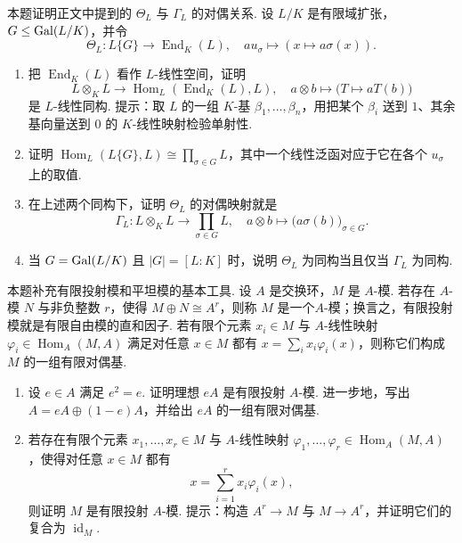 \begin{exercise}
    \begin{exgroup}
        \item 本题证明正文中提到的 $\Theta_L$ 与 $\Gamma_L$ 的对偶关系. 设 $L/K$ 是有限域扩张，$G\leq \operatorname{Gal}(L/K)$，并令
        \[
            \Theta_L\colon L\{G\}\to\operatorname{End}_K(L),\quad
            a u_\sigma\mapsto (x\mapsto a\sigma(x)).
        \]
        \begin{enumerate}
            \item 把 $\operatorname{End}_K(L)$ 看作 $L$-线性空间，证明
            \[
                L\otimes_K L\to \operatorname{Hom}_L(\operatorname{End}_K(L),L),\quad
                a\otimes b\mapsto\bigl(T\mapsto aT(b)\bigr)
            \]
            是 $L$-线性同构. 提示：取 $L$ 的一组 $K$-基 $\beta_1,\ldots,\beta_n$，用把某个 $\beta_i$ 送到 $1$、其余基向量送到 $0$ 的 $K$-线性映射检验单射性.
            \item 证明 $\operatorname{Hom}_L(L\{G\},L)\cong\prod_{\sigma\in G}L$，其中一个线性泛函对应于它在各个 $u_\sigma$ 上的取值.
            \item 在上述两个同构下，证明 $\Theta_L$ 的对偶映射就是
            \[
                \Gamma_L\colon L\otimes_K L\to\prod_{\sigma\in G}L,\quad
                a\otimes b\mapsto\bigl(a\sigma(b)\bigr)_{\sigma\in G}.
            \]
            \item 当 $G=\operatorname{Gal}(L/K)$ 且 $|G|=[L:K]$ 时，说明 $\Theta_L$ 为同构当且仅当 $\Gamma_L$ 为同构.
        \end{enumerate}
        \item 本题补充有限投射模和平坦模的基本工具. 设 $A$ 是交换环，$M$ 是 $A$-模. 若存在 $A$-模 $N$ 与非负整数 $r$，使得 $M\oplus N\cong A^r$，则称 $M$ 是一个$A$-模；换言之，有限投射模就是有限自由模的直和因子. 若有限个元素 $x_i\in M$ 与 $A$-线性映射 $\varphi_i\in\operatorname{Hom}_A(M,A)$ 满足对任意 $x\in M$ 都有 $x=\sum_i x_i\varphi_i(x)$，则称它们构成 $M$ 的一组有限对偶基.
        \begin{enumerate}
            \item 设 $e\in A$ 满足 $e^2=e$. 证明理想 $eA$ 是有限投射 $A$-模. 进一步地，写出 $A=eA\oplus(1-e)A$，并给出 $eA$ 的一组有限对偶基.
            \item 若存在有限个元素 $x_1,\ldots,x_r\in M$ 与 $A$-线性映射 $\varphi_1,\ldots,\varphi_r\in\operatorname{Hom}_A(M,A)$，使得对任意 $x\in M$ 都有
            \[
                x=\sum_{i=1}^r x_i\varphi_i(x),
            \]
            则证明 $M$ 是有限投射 $A$-模. 提示：构造 $A^r\to M$ 与 $M\to A^r$，并证明它们的复合为 $\operatorname{id}_M$.

\end{enumerate}
\end{exgroup}
\end{exercise}
